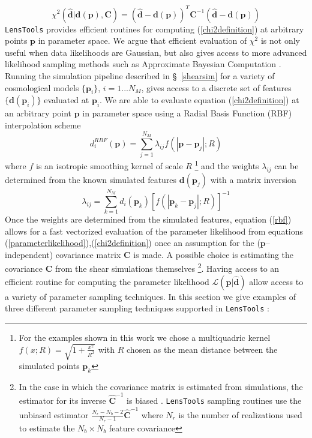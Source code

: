 \documentclass[reprint,aps,prd,superscriptaddress,showkeys,showpacs]{revtex4-1}
\newcommand{\bb}[1]{\mathbf{#1}}
\newcommand{\bbh}[1]{\mathbf{\hat{#1}}}
\newcommand{\LT}{\texttt{LensTools} }
\begin{document}
\begin{equation}
\label{chi2definition}
\chi^2\left(\bbh{d}\vert\bb{d}(\bb{p}),\bb{C}\right) = (\bbh{d}-\bb{d}(\bb{p}))^T\bb{C}^{-1}(\bbh{d}-\bb{d}(\bb{p}))
\end{equation}
%
\LT provides efficient routines for computing (\ref{chi2definition}) at arbitrary points $\bb{p}$ in parameter space. We argue that efficient evaluation of $\chi^2$ is not only useful when data likelihoods are Gaussian, but also gives access to more advanced likelihood sampling methods such as Approximate Bayesian Computation \citep{cosmoabc}.  
Running the simulation pipeline described in \S~\ref{shearsim} for a variety of cosmological models $\{\bb{p}_i\}$, $i=1...N_M$, gives access to a discrete set of features $\{\bb{d}(\bb{p}_i)\}$ evaluated at $\bb{p}_i$. We are able to evaluate equation (\ref{chi2definition}) at an arbitrary point $\bb{p}$ in parameter space using a Radial Basis Function (RBF) interpolation scheme 
\begin{equation}
\label{rbf}
d^{RBF}_i(\bb{p}) = \sum_{j=1}^{N_M}\lambda_{ij} f\left(\left\vert\bb{p}-\bb{p}_j\right\vert;R\right)
\end{equation} 
%
where $f$ is an isotropic smoothing kernel of scale $R$ \footnote{For the examples shown in this work we chose a multiquadric kernel $f(x;R)=\sqrt{1+\frac{x^2}{R^2}}$ with $R$ chosen as the mean distance between the simulated points $\bb{p}_k$} and the weights $\lambda_{ij}$ can be determined from the known simulated features $\bb{d}(\bb{p}_j)$ with a matrix inversion
\begin{equation}
\lambda_{ij} = \sum_{k=1}^{N_M}d_i(\bb{p}_k)\left[f\left(\left\vert\bb{p}_k-\bb{p}_j\right\vert;R\right)\right]^{-1}
\end{equation}
%
Once the weights are determined from the simulated features, equation (\ref{rbf}) allows for a fast vectorized evaluation of the parameter likelihood from equations (\ref{parameterlikelihood}),(\ref{chi2definition}) once an assumption for the ($\bb{p}$--independent) covariance matrix $\bb{C}$ is made. A possible choice is estimating the covariance $\bb{C}$ from the shear simulations themselves \footnote{In the case in which the covariance matrix is estimated from simulations, the estimator for its inverse $\bbh{C}^{-1}$ is biased \citep{Taylor12}. \LT sampling routines use the unbiased estimator $\frac{N_r-N_b-2}{N_r-1}\bbh{C}^{-1}$ where $N_r$ is the number of realizations used to estimate the $N_b\times N_b$ feature covariance}. Having access to an efficient routine for computing the parameter likelihood $\mathcal{L}(\bb{p}\vert\bbh{d})$ allow access to a variety of parameter sampling techniques. In this section we give examples of three different parameter sampling techniques supported in \LT:
\end{document}
